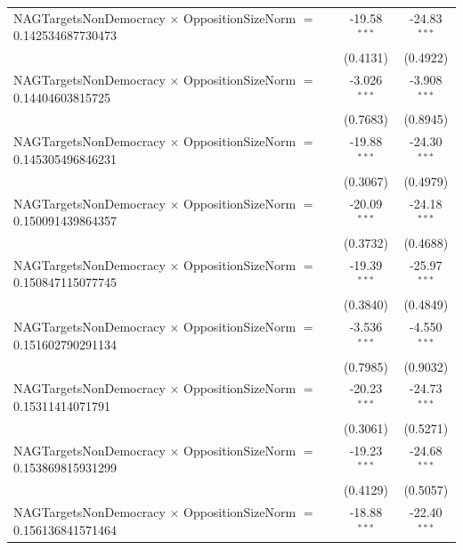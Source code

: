 \begin{tabular}{lcc}
   NAGTargetsNonDemocracy $\times$ OppositionSizeNorm $=$ 0.142534687730473     & -19.58$^{***}$       & -24.83$^{***}$\\   
                                                                                & (0.4131)             & (0.4922)\\   
   NAGTargetsNonDemocracy $\times$ OppositionSizeNorm $=$ 0.14404603815725      & -3.026$^{***}$       & -3.908$^{***}$\\   
                                                                                & (0.7683)             & (0.8945)\\   
   NAGTargetsNonDemocracy $\times$ OppositionSizeNorm $=$ 0.145305496846231     & -19.88$^{***}$       & -24.30$^{***}$\\   
                                                                                & (0.3067)             & (0.4979)\\   
   NAGTargetsNonDemocracy $\times$ OppositionSizeNorm $=$ 0.150091439864357     & -20.09$^{***}$       & -24.18$^{***}$\\   
                                                                                & (0.3732)             & (0.4688)\\   
   NAGTargetsNonDemocracy $\times$ OppositionSizeNorm $=$ 0.150847115077745     & -19.39$^{***}$       & -25.97$^{***}$\\   
                                                                                & (0.3840)             & (0.4849)\\   
   NAGTargetsNonDemocracy $\times$ OppositionSizeNorm $=$ 0.151602790291134     & -3.536$^{***}$       & -4.550$^{***}$\\   
                                                                                & (0.7985)             & (0.9032)\\   
   NAGTargetsNonDemocracy $\times$ OppositionSizeNorm $=$ 0.15311414071791      & -20.23$^{***}$       & -24.73$^{***}$\\   
                                                                                & (0.3061)             & (0.5271)\\   
   NAGTargetsNonDemocracy $\times$ OppositionSizeNorm $=$ 0.153869815931299     & -19.23$^{***}$       & -24.68$^{***}$\\   
                                                                                & (0.4129)             & (0.5057)\\   
   NAGTargetsNonDemocracy $\times$ OppositionSizeNorm $=$ 0.156136841571464     & -18.88$^{***}$       & -22.40$^{***}$\\   

\end{tabular}

